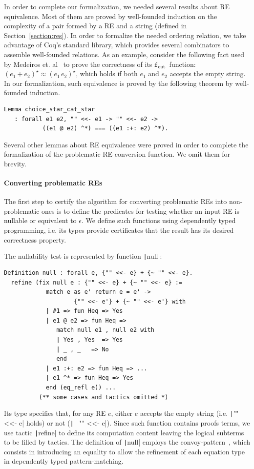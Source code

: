 \documentclass[oneside,12pt]{scrbook}
\theoremstyle{definition}
\newcommand{\fout}{\ensuremath{\texttt{f$_{\texttt{out}}$}}}
\newcommand{\coq}[1]{\texttt|#1|}
\theoremstyle{plain}
\theoremstyle{definition}
\begin{document}
In order to complete our formalization, we needed several results about RE
equivalence. Most of them are proved by well-founded induction on the complexity
of a pair formed by a RE and a string (defined in Section~\ref{section:res}).
In order to formalize the needed ordering relation, we take advantage of Coq's
standard library, which provides several combinators to assemble well-founded
relations. As an example, consider the following fact used by Medeiros et. al~\cite{Medeiros14} to
prove the correctness of its \fout~function: $(e_1 + e_2)^\star \approx
(e_1\,e_2)^\star$, which holds if both $e_1$ and $e_2$ accepts the empty string.
In our formalization, such equivalence is proved by the following theorem by well-founded induction.

\begin{verbatim}
Lemma choice_star_cat_star 
   : forall e1 e2, "" <<- e1 -> "" <<- e2 ->
		   ((e1 @ e2) ^*) === ((e1 :+: e2) ^*). 

\end{verbatim}
Several other lemmas about RE equivalence were proved in order to complete
the formalization of the problematic RE conversion function. We omit them
for brevity.

\paragraph{Converting problematic REs} The first step to certify the algorithm
for converting problematic REs into non-problematic ones is to define the
predicates for testing whether an input RE is nullable or equivalent to
$\epsilon$. We define such functions using dependently typed programming, i.e.
its types provide certificates that the result has its desired correctness
property.

The nullability test is represented by function \coq{null}:
\begin{verbatim}
Definition null : forall e, {"" <<- e} + {~ "" <<- e}.
  refine (fix null e : {"" <<- e} + {~ "" <<- e} :=
            match e as e' return e = e' -> 
                    {"" <<- e'} + {~ "" <<- e'} with
            | #1 => fun Heq => Yes
            | e1 @ e2 => fun Heq =>
               match null e1 , null e2 with
               | Yes , Yes  => Yes
               | _ , _   => No
               end 
            | e1 :+: e2 => fun Heq => ...
            | e1 ^* => fun Heq => Yes
            end (eq_refl e)) ...
          (** some cases and tactics omitted *)
\end{verbatim}
Its type specifies that, for any RE $e$, either $e$ accepts the empty string (i.e.
\coq{"" <<- e} holds) or not (\coq{~ "" <<- e}). Since such function contains
proofs terms, we use tactic \coq{refine} to define its computation content
leaving the logical subterms to be filled by tactics. The definition of
\coq{null} employs the convoy-pattern~\cite{Chlipala13}, which consists in
introducing an equality to allow the refinement of each equation type in
dependently typed pattern-matching.
\end{document}
